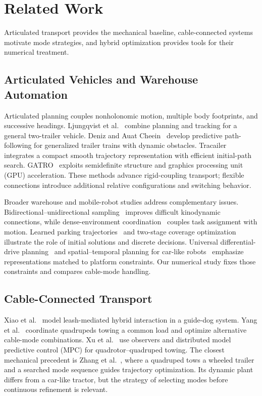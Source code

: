 \section{Related Work}
Articulated transport provides the mechanical baseline, cable-connected systems motivate mode strategies, and hybrid optimization provides tools for their numerical treatment.

\subsection{Articulated Vehicles and Warehouse Automation}
Articulated planning couples nonholonomic motion, multiple body footprints, and successive headings. Ljungqvist et al.~\cite{ljungqvist2019} combine planning and tracking for a general two-trailer vehicle. Deniz and Auat Cheein~\cite{deniz2025} develop predictive path-following for generalized trailer trains with dynamic obstacles. Tracailer~\cite{xu2025} integrates a compact smooth trajectory representation with efficient initial-path search. GATRO~\cite{gatro2026} exploits semidefinite structure and graphics processing unit (GPU) acceleration. These methods advance rigid-coupling transport; flexible connections introduce additional relative configurations and switching behavior.

Broader warehouse and mobile-robot studies address complementary issues. Bidirectional--unidirectional sampling~\cite{wang2022rrt} improves difficult kinodynamic connections, while dense-environment coordination~\cite{xu2024dense} couples task assignment with motion. Learned parking trajectories~\cite{chai2023} and two-stage coverage optimization~\cite{painting2025} illustrate the role of initial solutions and discrete decisions. Universal differential-drive planning~\cite{ddr2025} and spatial--temporal planning for car-like robots~\cite{han2024} emphasize representations matched to platform constraints. Our numerical study fixes those constraints and compares cable-mode handling.

\subsection{Cable-Connected Transport}
Xiao et al.~\cite{xiao2021} model leash-mediated hybrid interaction in a guide-dog system. Yang et al.~\cite{yang2022} coordinate quadrupeds towing a common load and optimize alternative cable-mode combinations. Xu et al.~\cite{xu2024cable} use observers and distributed model predictive control (MPC) for quadrotor--quadruped towing. The closest mechanical precedent is Zhang et al.~\cite{zhang2026}, where a quadruped tows a wheeled trailer and a searched mode sequence guides trajectory optimization. Its dynamic plant differs from a car-like tractor, but the strategy of selecting modes before continuous refinement is relevant.

